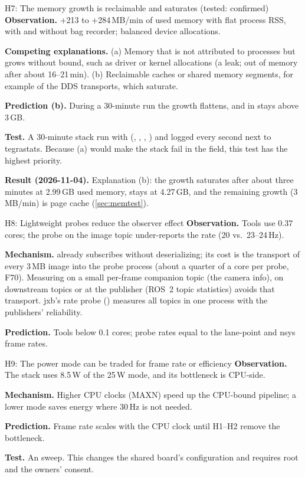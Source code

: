 \documentclass[11pt,a4paper]{article}
\newcommand{\jxb}{\textsf{jxb}}
\newcommand{\finding}[1]{\textsf{\small F#1}}
\begin{document}
\begin{hypbox}{H7: The memory growth is reclaimable and saturates (tested: confirmed)}
\textbf{Observation.} +213 to +284\,MB/min of used memory with flat process RSS, with and without bag recorder;
balanced device allocations.
\par\textbf{Competing explanations.} (a) Memory that is not attributed to processes but grows without bound, such as driver
or kernel allocations (a leak; out of memory after about 16--21\,min). (b) Reclaimable caches or shared memory
segments, for example of the DDS transports, which saturate.
\par\textbf{Prediction (b).} During a 30-minute run the growth flattens, and  in 
stays above 3\,GB.
\par\textbf{Test.} A 30-minute stack run with  (, , ,
) and  logged every second next to tegrastats. Because (a) would make the stack fail
in the field, this test has the highest priority.
\par\textbf{Result (2026-11-04).} Explanation (b): the growth saturates after about three minutes at 2.99\,GB used
memory,  stays at 4.27\,GB, and the remaining growth (3\,MB/min) is page cache
(\cref{sec:memtest}).
\end{hypbox}

\begin{hypbox}{H8: Lightweight probes reduce the observer effect}
\textbf{Observation.} Tools use 0.37 cores; the probe on the image topic under-reports the rate (20 vs.\ 23--24\,Hz).
\par\textbf{Mechanism.}  already subscribes without deserializing; its cost is the transport of
every 3\,MB image into the probe process (about a quarter of a core per probe, \finding{70}). Measuring on a small
per-frame companion topic (the camera info), on downstream topics or at the publisher (ROS~2 topic statistics) avoids
that transport. \jxb's rate probe () measures all topics in one process with the publishers'
reliability.
\par\textbf{Prediction.} Tools below 0.1 cores; probe rates equal to the lane-point and nsys frame rates.
\end{hypbox}

\begin{hypbox}{H9: The power mode can be traded for frame rate or efficiency}
\textbf{Observation.} The stack uses 8.5\,W of the 25\,W mode, and its bottleneck is CPU-side.
\par\textbf{Mechanism.} Higher CPU clocks (MAXN) speed up the CPU-bound pipeline; a lower mode saves energy where
30\,Hz is not needed.
\par\textbf{Prediction.} Frame rate scales with the CPU clock until H1--H2 remove the bottleneck.
\par\textbf{Test.} An  sweep. This changes the shared board's configuration and requires root and the
owners' consent.
\end{hypbox}
\end{document}
